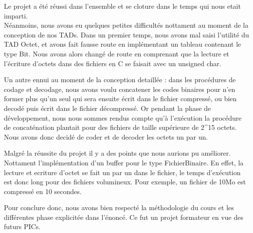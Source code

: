 Le projet a \'{e}t\'{e} réussi dans l'ensemble et se cloture dans le temps qui nous etait imparti. \\

N\'{e}anmoins, nous avons eu quelques petites difficultés nottament au moment de la conception de nos TADs. Dans un premier temps, nous avons mal saisi l'utilité du TAD Octet, et avons fait fausse route en impl\'{e}mentant un tableau contenant le type Bit. Nous avons alors chang\'{e} de route en comprenant que la lecture et l'\'{e}criture d'octets dans des fichiers en C se faisait avec un unsigned char.

Un autre ennui au moment de la conception detaill\'{e}e : dans les proc\'{e}dures de codage et decodage, nous avons voulu concatener les codes binaires pour n'en former plus qu'un seul qui sera ensuite \'{e}crit dans le fichier compress\'{e}, ou bien decodé puis \'{e}crit dans le fichier d\'{e}compress\'{e}. Or pendant la phase de d\'{e}veloppement, nous nous sommes rendus compte qu'à l'ex\'{e}cution la proc\'{e}dure de concat\'{e}nation plantait pour des fichiers de taille sup\'{e}rieure de 2\^{}15 octets. Nous avons donc decid\'{e} de coder et de decoder les octets un par un.

Malgr\'{e} la r\'{e}ussite du projet il y a des points que nous aurions pu am\'{e}liorer. Nottament l'impl\'{e}mentation d'un buffer pour le type FichierBinaire. En effet, la lecture et ecriture d'octet se fait un par un dans le fichier, le temps d'ex\'{e}cution est donc long pour des fichiers volumineux. Pour exemple, un fichier de 10Mo est compress\'{e} en 10 secondes.

Pour conclure donc, nous avons bien respect\'{e} la m\'{e}thodologie du cours et les diff\'{e}rentes phase explicit\'{e}e dans l'\'{e}nonc\'{e}. Ce fut un projet formateur en vue des futurs PICs.
